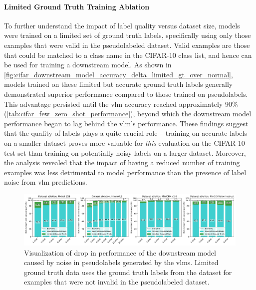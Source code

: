 \documentclass[../ShajiS_RnDReport.tex]{subfiles}
\begin{document}
\paragraph{Limited Ground Truth Training Ablation}
To further understand the impact of label quality versus dataset size, models were trained on a limited set of ground truth labels, specifically using only those examples that were valid in the pseudolabeled dataset. Valid examples are those that could be matched to a class name in the CIFAR-10 class list, and hence can be used for training a downstream model. As shown in \autoref{fig:cifar_downstream_model_accuracy_delta_limited_gt_over_normal}, models trained on these limited but accurate ground truth labels generally demonstrated superior performance compared to those trained on pseudolabels. This advantage persisted until the \gls{vlm} accuracy reached approximately 90\% (\autoref{tab:cifar_few_zero_shot_performance}), beyond which the downstream model performance began to lag behind the \gls{vlm}'s performance. These findings suggest that the quality of labels plays a quite crucial role -- training on accurate labels on a smaller dataset proves more valuable for \emph{this} evaluation on the CIFAR-10 test set than training on potentially noisy labels on a larger dataset. Moreover, the analysis revealed that the impact of having a reduced number of training examples was less detrimental to model performance than the presence of label noise from \gls{vlm} predictions.

\begin{figure}[ht]
    \centering
    \includegraphics[width=\linewidth]{figures/cifar_downstream_model_accuracy_delta_limited_gt_over_normal.pdf}
    \caption{Visualization of drop in performance of the downstream model caused by noise in pseudolabels generated by the \glspl{vlm}. Limited ground truth data uses the ground truth labels from the dataset for examples that were not invalid in the pseudolabeled dataset.}
    \label{fig:cifar_downstream_model_accuracy_delta_limited_gt_over_normal}
\end{figure}
\end{document}
